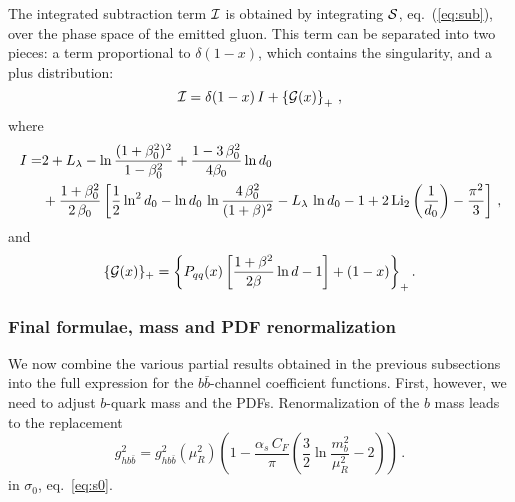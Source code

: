 The integrated subtraction term ${\cal I}$ is obtained by
integrating  ${\cal S}$, eq.~(\ref{eq:sub}),  over the phase space of
the emitted gluon. This term can be separated into two pieces: a term
proportional to 
$\delta(1-x)$, which contains the singularity,
and a plus distribution:
\begin{equation}
  {\cal I} = \delta(1-x)\,I + \left\{ {\cal G}(x) \right\}_+\,,
\end{equation}
where
\begin{equation}
  \begin{split}
    I  = &2 +L_{\lambda}- \ln{\frac{(1+\beta_0^2)^2}{1-\beta_0^2}} +
    \frac{1-3\,\beta_0^2}{4\beta_0}\ln d_0\\
     &+\frac{1+\beta_0^2}{2\,\beta_0}
    \left[
      \frac{1}{2}\ln^2 d_0
      -\ln d_0\,\ln {\frac{4\,\beta_0^2}{(1+\beta)^2}}
      - L_{\lambda}\,\ln d_0 -1
      +2\,{\rm Li}_2\left(\frac{1}{d_0} \right)-\frac{\pi^2}{3}
    \right]\,,
  \end{split}
\end{equation}
and
\begin{equation}
  \{{\cal G}(x)\}_+ =  {\left\{P_{qq}(x)\left[ \frac{1+\beta^2}{2\beta}
        \ln{d} -1 \right] +
      \left( 1-x \right)\right\}}_{+}\,.
\end{equation}

\subsubsection{Final formulae, mass and PDF renormalization}
We now combine the various partial results obtained in the previous
subsections  into the  full expression for the $b\bar{b}$-channel
coefficient functions. First, however, we need to adjust 
$b$-quark mass and the PDFs.
Renormalization of the  $b$ mass leads to the   replacement
\begin{equation}
  g_{hb\bar{b}}^2 = g_{hb\bar{b}}^2(\mu_R^2) \left(
    1-\frac{\alpha_s\,C_F}{\pi}\left(
        \frac{3}{2}\ln\frac{m_b^2}{\mu_R^2}-2  \right) \right)\,.
\end{equation}
in $\sigma_0$, eq.~\eqref{eq:s0}.


